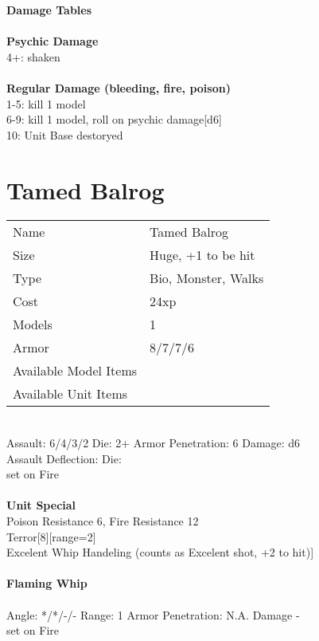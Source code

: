 {\bf Damage Tables} \\
\ \\ {\bf Psychic Damage } \\
4+: shaken \\
\ \\ {\bf Regular Damage (bleeding, fire, poison) } \\
1-5: kill 1 model \\
6-9: kill 1 model, roll on psychic damage[d6] \\
10: Unit Base destoryed \\









\pagebreak

\section{ Tamed Balrog }

\begin{tabular}{ll}
  Name & Tamed Balrog \\
  Size & Huge, +1 to be hit\\
  Type & Bio, Monster, Walks\\
  Cost & 24xp\\
  Models & 1\\
  Armor & 8/7/7/6\\
  Available Model Items &  \\
  Available Unit Items &  \\
\end{tabular}

\ \\
Assault: 6/4/3/2 Die: 2+ Armor Penetration: 6 Damage: d6 \\
Assault Deflection:  Die: \\
\indent set on Fire \\
\ \\

{\bf Unit Special} \\
Poison Resistance 6, Fire Resistance 12 \\ Terror[8][range=2]\\ Excelent Whip Handeling (counts as Excelent shot, +2 to hit)]
\ \\
\ \\
{\bf Flaming Whip } \\
\ \\
Angle: */*/-/- Range: 1 Armor Penetration: N.A. Damage - \\
\indent set on Fire \\





